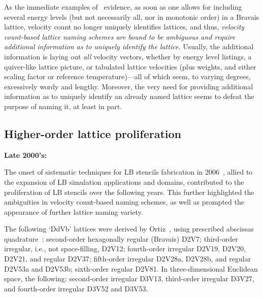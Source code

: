     As the immediate examples of~\cite{2006-PhilippiPC+SurmasR-PhysRevE} evidence, as soon as one allows for  including  several
    energy levels (but not necessarily all, nor in monotonic order) in a Bravais lattice,  velocity  count  no  longer  uniquely
    identifies lattices, and thus, \emph{velocity count-based lattice naming schemes are  bound  to  be  ambiguous  and  require
    additional information as to uniquely identify the lattice.\/} Usually, the additional information is laying out  \emph{all}
    velocity vectors, whether by energy level listings, a quiver-like lattice picture, or  tabulated  lattice  velocities  (plus
    weights, and either scaling factor or reference temperature)---all of which seem, to varying degrees, excessively wordy  and
    lengthy. Moreover, the very need for providing additional information as to uniquely identify an already named lattice seems
    to defeat the purpose of naming it, at least in part.

    \subsection{Higher-order lattice proliferation}

    \vspace{2.0mm}\noindent\textbf{Late 2000's:}\vspace{1.0mm}

    The onset of sistematic techniques  for  LB  stencils  fabrication  in  2006~\cite{2006-ChikatamarlaSS+KarlinIV-PhysRevLett,
    2006-PhilippiPC+SurmasR-PhysRevE, 2006-ShanX+ChenH-JFluidMech}, allied to the expansion of LB  simulation  applications  and
    domains, contributed to the proliferation of LB stencils over the following years. This further highlighted the  ambiguities
    in velocity count-based naming schemes, as well as prompted the appearance of further lattice naming variety.

    The  following  `DdVb'  lattices   were   derived   by   Ortiz~\cite{2007-OrtizCEP-DrUFSC},   using   prescribed   abscissas
    quadrature~\cite{2006-PhilippiPC+SurmasR-PhysRevE}: second-order hexagonally regular (Bravais) D2V7; third-order  irregular,
    i.e., not space-filling, D2V12; fourth-order irregular D2V19, D2V20, D2V21, and regular D2V37; fifth-order irregular D2V28a,
    D2V28b, and regular D2V53a and D2V53b; sixth-order regular D2V81.  In  three-dimensional  Euclidean  space,  the  following:
    second-order irregular D3V13, third-order irregular D3V27, and fourth-order irregular D3V52 and D3V53.


